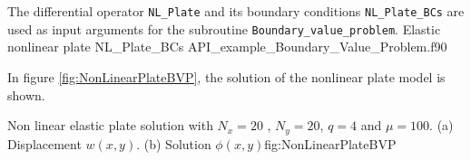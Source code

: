         
     
The differential operator \verb|NL_Plate| and its boundary conditions \verb|NL_Plate_BCs| are used as input arguments for the subroutine 
\verb|Boundary_value_problem|.       
          \vspace{0.5cm} 
          {Elastic nonlinear plate}
          {NL_Plate_BCs}
          {API_example_Boundary_Value_Problem.f90}
          
        
In figure \ref{fig:NonLinearPlateBVP}, the solution of the nonlinear plate model is shown. 
          
             
          
          \twographs
          {}
          {}
          {Non linear elastic plate solution with $ N_x = 20 $ , $ N_y = 20 $, $q=4$ and $\mu=100$. (a) Displacement $w(x,y)$.
          (b) Solution $\phi(x,y)$}{fig:NonLinearPlateBVP}







